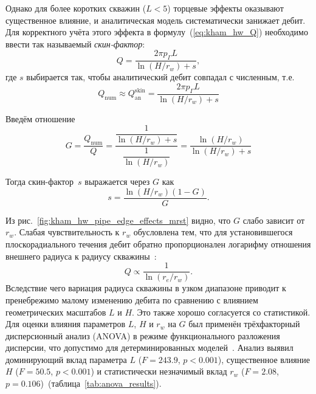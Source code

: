 \documentclass{article}
\begin{document}
Однако для более коротких скважин ($L < 5$) торцевые эффекты оказывают существенное влияние,
и аналитическая модель систематически занижает дебит. Для корректного учёта этого эффекта
в формулу~(\ref{eq:kham_hw_Q}) необходимо ввести так называемый \textit{скин-фактор}:
\begin{equation}
	\displaystyle
	Q = \dfrac{2 \pi p_{\Gamma} L}{\ln \left( H / r_w \right) + s},
	\label{eq:kham_hw_Q_skin}
\end{equation}
где $s$ выбирается так, чтобы аналитический дебит совпадал с численным,
т.е.
\begin{equation*}
	\displaystyle
	Q_{\text{num}} \approx Q_{\text{an}}^{\text{skin}} = \dfrac{2 \pi p_{\Gamma} L}{\ln \left( H / r_w \right) + s}
\end{equation*}

Введём отношение
\begin{equation}
	\displaystyle
	G = \dfrac{Q_{\text{num}}}{Q} = \dfrac{\dfrac{1}{\ln \left( H / r_w \right) + s}}{\dfrac{1}{\ln \left( H / r_w \right)}}  =
	\dfrac{\ln  \left( H / r_w \right)}{\ln  \left( H / r_w \right) + s}
	\label{eq:kham_hw_skin_G}
\end{equation}

Тогда скин-фактор~$s$ выражается через $G$ как
\begin{equation}
	\displaystyle
	s = \dfrac{\ln  \left( H / r_w \right) \left(1-G \right)}{G}.
	\label{eq:kham_hw_skin}
\end{equation}

Из рис.~\ref{fig:kham_hw_pipe_edge_effects_mrst} видно, что $G$ слабо зависит от $r_w$.
Слабая чувствительность к \(r_w\) обусловлена тем, что для установившегося плоскорадиального течения
дебит обратно пропорционален логарифму отношения внешнего радиуса к радиусу скважины~\cite{lit:kham_barenblatt1984}:
\begin{equation*}
	Q \propto \frac{1}{\ln(r_e / r_w)}.
\end{equation*}
Вследствие чего вариация радиуса скважины в узком диапазоне приводит к пренебрежимо малому
изменению дебита по сравнению с влиянием геометрических масштабов \(L\) и \(H\).
Это также хорошо согласуется со статистикой. Для оценки влияния параметров \(L\), \(H\) и \(r_w\) на \(G\) был применён
трёхфакторный дисперсионный анализ (ANOVA) в режиме функционального разложения дисперсии, что
допустимо для детерминированных моделей~\cite{lit:kham_saltelli2008global}. Анализ выявил доминирующий
вклад параметра \(L\) (\(F = 243.9\), \(p < 0.001\)), существенное влияние \(H\) (\(F = 50.5\), \(p < 0.001\))
и статистически незначимый вклад \(r_w\) (\(F = 2.08\), \(p = 0.106\))~(таблица~\ref{tab:anova_results}).
\end{document}
